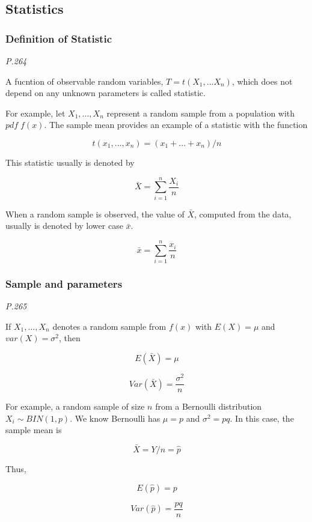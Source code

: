 \documentclass[
]{book}
\begin{document}
\hypertarget{statistics}{%
\subsection{Statistics}\label{statistics}}

\hypertarget{definition-of-statistic}{%
\subsubsection{Definition of Statistic}\label{definition-of-statistic}}

\emph{P.264}

A fucntion of observable random variables, \(T=t(X_1, ... X_n)\), which does not depend on any unknown parameters is called statistic.

For example, let \(X_1, ..., X_n\) represent a random sample from a population with \(pdf \;f(x)\). The sample mean provides an example of a statistic with the function

\[t(x_1,...,x_n)=(x_1+...+x_n)/n\]

This statistic usually is denoted by

\[\bar{X}=\sum_{i=1}^n \frac{X_i}{n}\]

When a random sample is observed, the value of \(\bar{X}\), computed from the data, usually is denoted by lower case \(\bar{x}\).

\[\bar{x}=\sum_{i=1}^n \frac{x_i}{n}\]

\hypertarget{sample-and-parameters}{%
\subsubsection{Sample and parameters}\label{sample-and-parameters}}

\emph{P.265}

If \(X_1,..., X_n\) denotes a random sample from \(f(x)\) with \(E(X)=\mu\) and \(var(X)=\sigma^2\), then

\[E(\bar{X})=\mu\]

\[Var(\bar{X})=\frac{\sigma^2}{n}\]

For example, a random sample of size \(n\) from a Bernoulli distribution \(X_i \sim BIN(1,p)\). We know Bernoulli has \(\mu=p\) and \(\sigma^2 =pq\). In this case, the sample mean is

\[\bar{X}=Y/n=\hat{p}\]

Thus,

\[E(\hat{p})=p\]

\[Var (\hat{p})=\frac{pq}{n}\]
\end{document}
